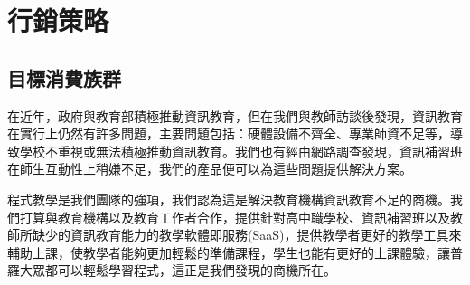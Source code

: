 \section{行銷策略}

\subsection{目標消費族群}
\setlength{\parindent}{2em}
\par 在近年，政府與教育部積極推動資訊教育，但在我們與教師訪談後發現，資訊教育在實行上仍然有許多問題，主要問題包括：硬體設備不齊全、專業師資不足等，導致學校不重視或無法積極推動資訊教育。我們也有經由網路調查發現，資訊補習班在師生互動性上稍嫌不足，我們的產品便可以為這些問題提供解決方案。
\par 程式教學是我們團隊的強項，我們認為這是解決教育機構資訊教育不足的商機。我們打算與教育機構以及教育工作者合作，提供針對高中職學校、資訊補習班以及教師所缺少的資訊教育能力的教學軟體即服務(SaaS)，提供教學者更好的教學工具來輔助上課，使教學者能夠更加輕鬆的準備課程，學生也能有更好的上課體驗，讓普羅大眾都可以輕鬆學習程式，這正是我們發現的商機所在。

